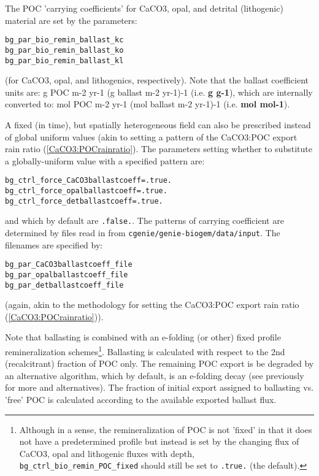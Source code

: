 The POC 'carrying coefficients' for CaCO3, opal, and detrital (lithogenic) material are set by the parameters:
\vspace{-2pt}\begin{verbatim}
bg_par_bio_remin_ballast_kc
bg_par_bio_remin_ballast_ko
bg_par_bio_remin_ballast_kl
\end{verbatim}\vspace{-2pt}
(for CaCO3, opal, and lithogenics, respectively). Note that the ballast coefficient units are: g POC m-2 yr-1 (g ballast m-2 yr-1)-1 (i.e. \textbf{g g-1}), which are internally converted to: mol POC m-2 yr-1 (mol ballast m-2 yr-1)-1 (i.e. \textbf{mol mol-1}).

A fixed (in time), but spatially heterogeneous field can also be prescribed instead of global uniform values (akin to setting a pattern of the CaCO3:POC export rain ratio (\ref{CaCO3:POCrainratio}). The parameters setting whether to substitute a globally-uniform value with a specified pattern are:
\vspace{-2pt}\begin{verbatim}
bg_ctrl_force_CaCO3ballastcoeff=.true.
bg_ctrl_force_opalballastcoeff=.true.
bg_ctrl_force_detballastcoeff=.true.
\end{verbatim}\vspace{-2pt}
and which by default are \texttt{.false.}.
The patterns of carrying coefficient are determined by files read in from \texttt{cgenie\slash genie-biogem\slash data\slash input}. The filenames are specified by:
\vspace{-2pt}\begin{verbatim}
bg_par_CaCO3ballastcoeff_file
bg_par_opalballastcoeff_file
bg_par_detballastcoeff_file
\end{verbatim}\vspace{-2pt}
(again, akin to the methodology for setting the CaCO3:POC export rain ratio (\ref{CaCO3:POCrainratio})).

Note that ballasting is combined with an e-folding (or other) fixed profile remineralization schemes\footnote{Although in a sense, the remineralization of POC is not 'fixed' in that it does not have a predetermined profile but instead is set by the changing flux of CaCO3, opal and lithogenic fluxes with depth, \texttt{bg\_ctrl\_bio\_remin\_POC\_fixed} should still be set to \texttt{.true.} (the default).}. Ballasting is calculated with respect to the 2nd (recalcitrant) fraction of POC only. The remaining POC export is be degraded by an alternative algorithm, which by default, is an e-folding decay (see previously for more and alternatives). The fraction of initial export assigned to ballasting vs. 'free' POC is calculated according to the available exported ballast flux.

